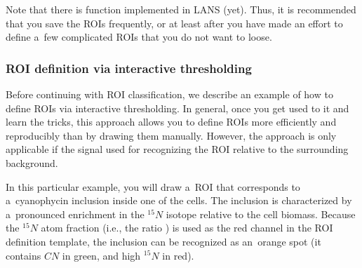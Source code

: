 


Note that there is  function implemented in LANS (yet). Thus, it is recommended that you save the ROIs frequently, or at least after you have made an effort to define a~few complicated ROIs that you do not want to loose.
\tcbe



\subsubsection{ROI definition via interactive thresholding}
\setcounter{step}{0}
\label{sec:defineROIsInteractive}

\goldbox{}
Before continuing with ROI classification, we describe an example of how to define ROIs via interactive thresholding. In general, once you get used to it and learn the tricks, this approach allows you to define ROIs more efficiently and reproducibly than by drawing them manually. However, the approach is only applicable if the signal used for recognizing the ROI  relative to the surrounding background.
\tcbe

In this particular example, you will draw a~ROI that corresponds to a~cyanophycin inclusion inside one of the cells. The inclusion is characterized by a~pronounced enrichment in the ${}^{15}N$ isotope relative to the cell biomass. Because the ${}^{15}N$ atom fraction (i.e., the ratio ) is used as the red channel in the ROI definition template, the inclusion can be recognized as an~orange spot (it contains $CN$ in green, and high ${}^{15}N$ in red).


